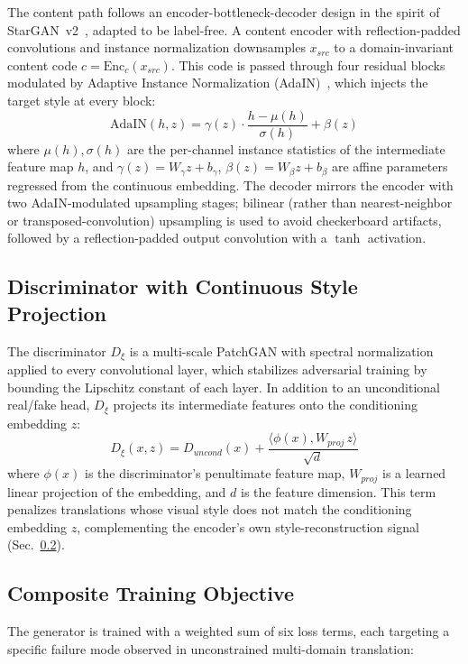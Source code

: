 \documentclass[runningheads]{llncs}
\begin{document}
The content path follows an encoder-bottleneck-decoder design in the spirit of StarGAN~v2~\cite{choi2020starganv2}, adapted to be label-free. A content encoder with reflection-padded convolutions and instance normalization downsamples $x_{src}$ to a domain-invariant content code $c = \mathrm{Enc}_c(x_{src})$. This code is passed through four residual blocks modulated by Adaptive Instance Normalization (AdaIN)~\cite{huang2017adain}, which injects the target style at every block:
\begin{equation}
\mathrm{AdaIN}(h, z) = \gamma(z)\cdot\frac{h - \mu(h)}{\sigma(h)} + \beta(z)
\label{eq:adain}
\end{equation}
where $\mu(h), \sigma(h)$ are the per-channel instance statistics of the intermediate feature map $h$, and $\gamma(z) = W_\gamma z + b_\gamma$, $\beta(z) = W_\beta z + b_\beta$ are affine parameters regressed from the continuous embedding. The decoder mirrors the encoder with two AdaIN-modulated upsampling stages; bilinear (rather than nearest-neighbor or transposed-convolution) upsampling is used to avoid checkerboard artifacts, followed by a reflection-padded output convolution with a $\tanh$ activation.

\subsection{Discriminator with Continuous Style Projection}
The discriminator $D_\xi$ is a multi-scale PatchGAN with spectral normalization~\cite{miyato2018spectral} applied to every convolutional layer, which stabilizes adversarial training by bounding the Lipschitz constant of each layer. In addition to an unconditional real/fake head, $D_\xi$ projects its intermediate features onto the conditioning embedding $z$:
\begin{equation}
D_\xi(x, z) = D_{uncond}(x) + \frac{\langle \phi(x), W_{proj}\,z\rangle}{\sqrt{d}}
\label{eq:disc}
\end{equation}
where $\phi(x)$ is the discriminator's penultimate feature map, $W_{proj}$ is a learned linear projection of the embedding, and $d$ is the feature dimension. This term penalizes translations whose visual style does not match the conditioning embedding $z$, complementing the encoder's own style-reconstruction signal (Sec.~\ref{sec:objective}).

\subsection{Composite Training Objective}
\label{sec:objective}
The generator is trained with a weighted sum of six loss terms, each targeting a specific failure mode observed in unconstrained multi-domain translation:
\end{document}
